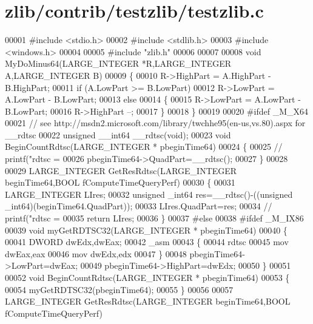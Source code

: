 \hypertarget{zlib_2contrib_2testzlib_2testzlib_8c_source}{}\section{zlib/contrib/testzlib/testzlib.c}
\label{zlib_2contrib_2testzlib_2testzlib_8c_source}

\begin{DoxyCode}
00001 \textcolor{preprocessor}{#include <stdio.h>}
00002 \textcolor{preprocessor}{#include <stdlib.h>}
00003 \textcolor{preprocessor}{#include <windows.h>}
00004 
00005 \textcolor{preprocessor}{#include "zlib.h"}
00006 
00007 
00008 \textcolor{keywordtype}{void} MyDoMinus64(LARGE\_INTEGER *R,LARGE\_INTEGER A,LARGE\_INTEGER B)
00009 \{
00010     R->HighPart = A.HighPart - B.HighPart;
00011     \textcolor{keywordflow}{if} (A.LowPart >= B.LowPart)
00012         R->LowPart = A.LowPart - B.LowPart;
00013     \textcolor{keywordflow}{else}
00014     \{
00015         R->LowPart = A.LowPart - B.LowPart;
00016         R->HighPart --;
00017     \}
00018 \}
00019 
00020 \textcolor{preprocessor}{#ifdef \_M\_X64}
00021 \textcolor{comment}{// see http://msdn2.microsoft.com/library/twchhe95(en-us,vs.80).aspx for \_\_rdtsc}
00022 \textcolor{keywordtype}{unsigned} \_\_int64 \_\_rdtsc(\textcolor{keywordtype}{void});
00023 \textcolor{keywordtype}{void} BeginCountRdtsc(LARGE\_INTEGER * pbeginTime64)
00024 \{
00025  \textcolor{comment}{//   printf("rdtsc = %
00026    pbeginTime64->QuadPart=\_\_rdtsc();
00027 \}
00028 
00029 LARGE\_INTEGER GetResRdtsc(LARGE\_INTEGER beginTime64,BOOL fComputeTimeQueryPerf)
00030 \{
00031     LARGE\_INTEGER LIres;
00032     \textcolor{keywordtype}{unsigned} \_int64 res=\_\_rdtsc()-((\textcolor{keywordtype}{unsigned} \_int64)(beginTime64.QuadPart));
00033     LIres.QuadPart=res;
00034    \textcolor{comment}{// printf("rdtsc = %
00035     \textcolor{keywordflow}{return} LIres;
00036 \}
00037 \textcolor{preprocessor}{#else}
00038 \textcolor{preprocessor}{#ifdef \_M\_IX86}
00039 \textcolor{keywordtype}{void} myGetRDTSC32(LARGE\_INTEGER * pbeginTime64)
00040 \{
00041     DWORD dwEdx,dwEax;
00042     \_asm
00043     \{
00044         rdtsc
00045         mov dwEax,eax
00046         mov dwEdx,edx
00047     \}
00048     pbeginTime64->LowPart=dwEax;
00049     pbeginTime64->HighPart=dwEdx;
00050 \}
00051 
00052 \textcolor{keywordtype}{void} BeginCountRdtsc(LARGE\_INTEGER * pbeginTime64)
00053 \{
00054     myGetRDTSC32(pbeginTime64);
00055 \}
00056 
00057 LARGE\_INTEGER GetResRdtsc(LARGE\_INTEGER beginTime64,BOOL fComputeTimeQueryPerf)
}}
\end{DoxyCode}
